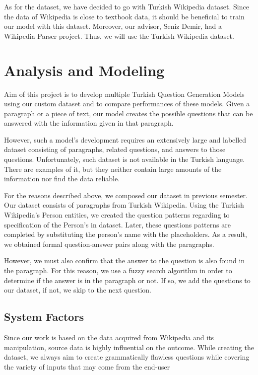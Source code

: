 \documentclass{mefsdp}
\begin{document}
	As for the dataset, we have decided to go with Turkish Wikipedia dataset. Since the data of Wikipedia is close to textbook data, it should be beneficial to train our model with this dataset. Moreover, our advisor, Seniz Demir, had a Wikipedia Parser project. Thus, we will use the Turkish Wikipedia dataset.
	
	
	
	\section{Analysis and Modeling}
	\label{refhere}
	Aim of this project is to develop multiple Turkish Question Generation Models using our custom dataset and to compare performances of these models. Given a paragraph or a piece of text, our model creates the possible questions that can be answered with the information given in that paragraph. \newline \par
	
	However, such a model's development requires an extensively large and labelled dataset consisting of paragraphs, related questions, and answers to those questions. Unfortunately, such dataset is not available in the Turkish language. There are examples of it, but they neither contain large amounts of the information nor find the data reliable. \newline \par
	
	For the reasons described above, we composed our dataset in previous semester. Our dataset consists of paragraphs from Turkish Wikipedia. Using the Turkish Wikipedia's Person entities, we created the question patterns regarding to specification of the Person's in dataset. Later, these questions patterns are completed by substituting the person's name with the placeholders. As a result, we obtained formal question-answer pairs along with the paragraphs. \newline \par
	
	However, we must also confirm that the answer to the question is also found in the paragraph. For this reason, we use a fuzzy search algorithm in order to determine if the answer is in the paragraph or not. If so, we add the questions to our dataset, if not, we skip to the next question. \newline \par
	
	
	
	\subsection{System Factors}
	Since our work is based on the data acquired from Wikipedia and its manipulation, source data is highly influential on the outcome. While creating the dataset, we always aim to create grammatically flawless questions while covering the variety of inputs that may come from the end-user
	
\end{document}
